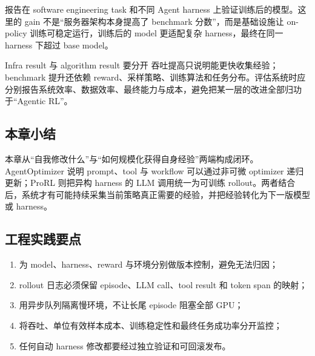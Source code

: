 报告在 software engineering task 和不同 Agent harness 上验证训练后的模型。这里的 gain 不是“服务器架构本身提高了 benchmark 分数”，而是基础设施让 on-policy 训练可稳定运行，训练后的 model 更适配复杂 harness，最终在同一 harness 下超过 base model。



\begin{warningbox}{Infra result 与 algorithm result 要分开}
吞吐提高只说明能更快收集经验；benchmark 提升还依赖 reward、采样策略、训练算法和任务分布。评估系统时应分别报告系统效率、数据效率、最终能力与成本，避免把某一层的改进全部归功于“Agentic RL”。
\end{warningbox}


\subsection{本章小结}

本章从“自我修改什么”与“如何规模化获得自身经验”两端构成闭环。AgentOptimizer 说明 prompt、tool 与 workflow 可以通过非可微 optimizer 递归更新；ProRL 则把异构 harness 的 LLM 调用统一为可训练 rollout。两者结合后，系统才有可能持续采集当前策略真正需要的经验，并把经验转化为下一版模型或 harness。

\subsection{工程实践要点}

\begin{enumerate}
    \item 为 model、harness、reward 与环境分别做版本控制，避免无法归因；
    \item rollout 日志必须保留 episode、LLM call、tool result 和 token span 的映射；
    \item 用异步队列隔离慢环境，不让长尾 episode 阻塞全部 GPU；
    \item 将吞吐、单位有效样本成本、训练稳定性和最终任务成功率分开监控；
    \item 任何自动 harness 修改都要经过独立验证和可回滚发布。
\end{enumerate}
